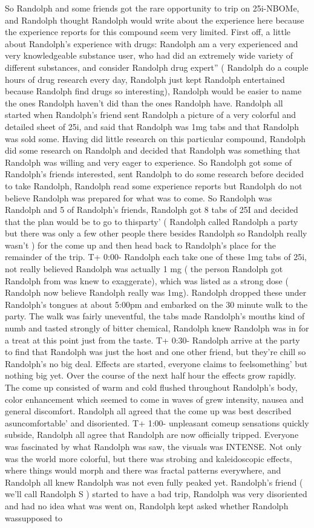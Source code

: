 \documentclass[12pt]{book}
\begin{document}
So Randolph and some friends got the rare opportunity to trip on 25i-NBOMe, and Randolph thought Randolph would write about the experience here because the experience reports for this compound seem very limited. First off, a little about Randolph's experience with drugs: Randolph am a very experienced and very knowledgeable substance user, who had did an extremely wide variety of different substances, and consider Randolph drug expert'' ( Randolph do a couple hours of drug research every day, Randolph just kept Randolph entertained because Randolph find drugs so interesting), Randolph would be easier to name the ones Randolph haven't did than the ones Randolph have. Randolph all started when Randolph's friend sent Randolph a picture of a very colorful and detailed sheet of 25i, and said that Randolph was 1mg tabs and that Randolph was sold some. Having did little research on this particular compound, Randolph did some research on Randolph and decided that Randolph was something that Randolph was willing and very eager to experience. So Randolph got some of Randolph's friends interested, sent Randolph to do some research before decided to take Randolph, Randolph read some experience reports but Randolph do not believe Randolph was prepared for what was to come. So Randolph was Randolph and 5 of Randolph's friends, Randolph got 8 tabs of 25I and decided that the plan would be to go to thisparty' ( Randolph called Randolph a party but there was only a few other people there besides Randolph so Randolph really wasn't ) for the come up and then head back to Randolph's place for the remainder of the trip. T+ 0:00- Randolph each take one of these 1mg tabs of 25i, not really believed Randolph was actually 1 mg ( the person Randolph got Randolph from was knew to exaggerate), which was listed as a strong dose ( Randolph now believe Randolph really was 1mg). Randolph dropped these under Randolph's tongues at about 5:00pm and embarked on the 30 minute walk to the party. The walk was fairly uneventful, the tabs made Randolph's mouths kind of numb and tasted strongly of bitter chemical, Randolph knew Randolph was in for a treat at this point just from the taste. T+ 0:30- Randolph arrive at the party to find that Randolph was just the host and one other friend, but they're chill so Randolph's no big deal. Effects are started, everyone claims to feelsomething' but nothing big yet. Over the course of the next half hour the effects grow rapidly. The come up consisted of warm and cold flushed throughout Randolph's body, color enhancement which seemed to come in waves of grew intensity, nausea and general discomfort. Randolph all agreed that the come up was best described asuncomfortable' and disoriented. T+ 1:00- unpleasant comeup sensations quickly subside, Randolph all agree that Randolph are now officially tripped. Everyone was fascinated by what Randolph was saw, the visuals was INTENSE. Not only was the world more colorful, but there was strobing and kaleidoscopic effects, where things would morph and there was fractal patterns everywhere, and Randolph all knew Randolph was not even fully peaked yet. Randolph's friend ( we'll call Randolph S ) started to have a bad trip, Randolph was very disoriented and had no idea what was went on, Randolph kept asked whether Randolph wassupposed to 
\end{document}
